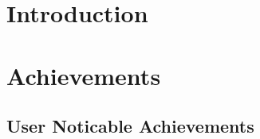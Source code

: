 
\pagestyle{plain}
\setcounter{page}{1}

\section{Introduction}\label{cha:intro}
%


\section{Achievements}\label{cha:achievements}


\subsection{User Noticable Achievements}\label{sec:userachievments}


